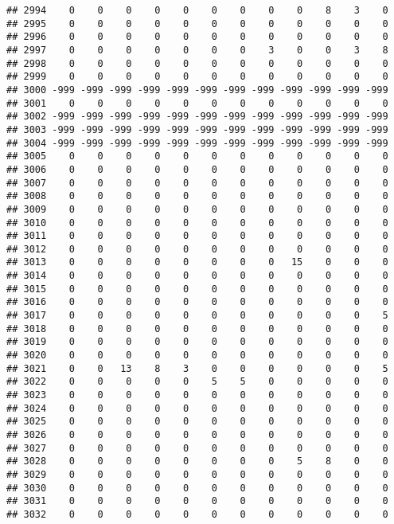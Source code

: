 \documentclass[]{article}
\begin{document}
\begin{verbatim}
## 2994    0    0    0    0    0    0    0    0    0    8    3    0
## 2995    0    0    0    0    0    0    0    0    0    0    0    0
## 2996    0    0    0    0    0    0    0    0    0    0    0    0
## 2997    0    0    0    0    0    0    0    3    0    0    3    8
## 2998    0    0    0    0    0    0    0    0    0    0    0    0
## 2999    0    0    0    0    0    0    0    0    0    0    0    0
## 3000 -999 -999 -999 -999 -999 -999 -999 -999 -999 -999 -999 -999
## 3001    0    0    0    0    0    0    0    0    0    0    0    0
## 3002 -999 -999 -999 -999 -999 -999 -999 -999 -999 -999 -999 -999
## 3003 -999 -999 -999 -999 -999 -999 -999 -999 -999 -999 -999 -999
## 3004 -999 -999 -999 -999 -999 -999 -999 -999 -999 -999 -999 -999
## 3005    0    0    0    0    0    0    0    0    0    0    0    0
## 3006    0    0    0    0    0    0    0    0    0    0    0    0
## 3007    0    0    0    0    0    0    0    0    0    0    0    0
## 3008    0    0    0    0    0    0    0    0    0    0    0    0
## 3009    0    0    0    0    0    0    0    0    0    0    0    0
## 3010    0    0    0    0    0    0    0    0    0    0    0    0
## 3011    0    0    0    0    0    0    0    0    0    0    0    0
## 3012    0    0    0    0    0    0    0    0    0    0    0    0
## 3013    0    0    0    0    0    0    0    0   15    0    0    0
## 3014    0    0    0    0    0    0    0    0    0    0    0    0
## 3015    0    0    0    0    0    0    0    0    0    0    0    0
## 3016    0    0    0    0    0    0    0    0    0    0    0    0
## 3017    0    0    0    0    0    0    0    0    0    0    0    5
## 3018    0    0    0    0    0    0    0    0    0    0    0    0
## 3019    0    0    0    0    0    0    0    0    0    0    0    0
## 3020    0    0    0    0    0    0    0    0    0    0    0    0
## 3021    0    0   13    8    3    0    0    0    0    0    0    5
## 3022    0    0    0    0    0    5    5    0    0    0    0    0
## 3023    0    0    0    0    0    0    0    0    0    0    0    0
## 3024    0    0    0    0    0    0    0    0    0    0    0    0
## 3025    0    0    0    0    0    0    0    0    0    0    0    0
## 3026    0    0    0    0    0    0    0    0    0    0    0    0
## 3027    0    0    0    0    0    0    0    0    0    0    0    0
## 3028    0    0    0    0    0    0    0    0    5    8    0    0
## 3029    0    0    0    0    0    0    0    0    0    0    0    0
## 3030    0    0    0    0    0    0    0    0    0    0    0    0
## 3031    0    0    0    0    0    0    0    0    0    0    0    0
## 3032    0    0    0    0    0    0    0    0    0    0    0    0

\end{verbatim}
\end{document}
